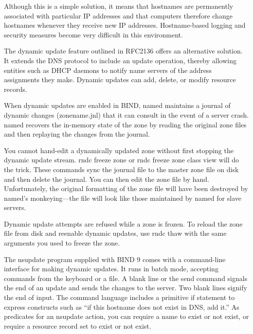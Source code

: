 
Although this is a simple solution, it means that hostnames are
permanently associated with particular IP addresses and that computers
therefore change {hostnames} whenever they receive new IP addresses.
Hostname-based logging and security measures become very difficult in
this environment.

The dynamic update feature outlined in RFC2136 offers an alternative
solution. It extends the DNS protocol to include an update operation,
thereby allowing entities such as DHCP daemons to notify name servers of
the address assignments they make. Dynamic updates can add, delete, or
modify resource records.

When dynamic updates are enabled in BIND, {named} maintains a journal of
dynamic changes ({zonename}{.jnl}) that it can consult in the event of a
server crash. {named }recovers the in-memory state of the zone by
reading the original zone files and then replaying the changes from the
journal.

You cannot hand-edit a dynamically updated zone without first stopping
the dynamic update stream.
\protect\hypertarget{part0024_split_052.htmlux5cux23_idIndexMarker2227}{}{}\protect\hypertarget{part0024_split_052.htmlux5cux23_idIndexMarker2228}{}{}{rndc
freeze }{zone}{ }or{ rndc freeze }{zone class view}{ }will do the trick.
These commands sync the journal file to the master zone file on disk and
then delete the journal. You can then edit the zone file by hand.
Unfortunately, the original formatting of the zone file will have been
destroyed by {named}'s monkeying---the file will look like those
maintained by {named} for slave servers.

Dynamic update attempts are refused while a zone is frozen. To reload
the zone file from disk and reenable dynamic updates, use {rndc thaw}
with the same arguments you used to freeze the zone.

The
\protect\hypertarget{part0024_split_052.htmlux5cux23_idIndexMarker2229}{}{}{nsupdate}
program supplied with BIND 9 comes with a command-line interface for
making dynamic updates. It runs in batch mode, accepting commands from
the keyboard or a file. A blank line or the {send} command signals the
end of an update and sends the changes to the server. Two blank lines
signify the end of input. The command language includes a primitive if
statement to express constructs such as ``if this hostname does not
exist in DNS, add it.'' As predicates for an {nsupdate} action, you can
require a name to exist or not exist, or require a resource record set
to exist or not exist.

